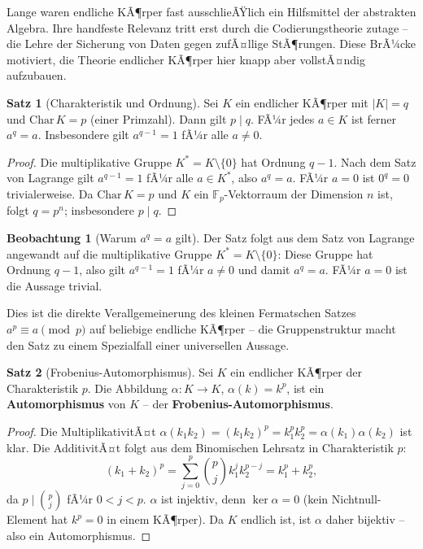 ﻿\documentclass[a4paper,12pt]{report}
\theoremstyle{definition}
\newtheorem{satz}{Satz}
\newtheorem{beobachtung}{Beobachtung}
\begin{document}
Lange waren endliche KÃ¶rper fast ausschlieÃŸlich ein Hilfsmittel der
abstrakten Algebra. Ihre handfeste Relevanz tritt erst durch die
Codierungstheorie zutage -- die Lehre der Sicherung von Daten gegen
zufÃ¤llige StÃ¶rungen. Diese BrÃ¼cke motiviert, die Theorie endlicher
KÃ¶rper hier knapp aber vollstÃ¤ndig aufzubauen.

\begin{satz}[Charakteristik und Ordnung]
    Sei $K$ ein endlicher KÃ¶rper mit $|K| = q$ und $\mathrm{Char}\, K = p$
    (einer Primzahl). Dann gilt $p \mid q$. FÃ¼r jedes $a \in K$ ist ferner
    $a^q = a$. Insbesondere gilt $a^{q-1} = 1$ fÃ¼r alle $a \neq 0$.
\end{satz}
\begin{proof}
    Die multiplikative Gruppe $K^* = K \setminus \{0\}$ hat Ordnung $q - 1$.
    Nach dem Satz von Lagrange gilt $a^{q-1} = 1$ fÃ¼r alle $a \in K^*$,
    also $a^q = a$. FÃ¼r $a = 0$ ist $0^q = 0$ trivialerweise. Da
    $\mathrm{Char}\, K = p$ und $K$ ein $\mathbb{F}_p$-Vektorraum der
    Dimension $n$ ist, folgt $q = p^n$; insbesondere $p \mid q$.
\end{proof}


\begin{beobachtung}[Warum \texorpdfstring{$a^q = a$}{a^q = a} gilt]
    Der Satz folgt aus dem Satz von Lagrange angewandt auf die multiplikative
    Gruppe $K^* = K \setminus \{0\}$: Diese Gruppe hat Ordnung $q - 1$,
    also gilt $a^{q-1} = 1$ fÃ¼r $a \neq 0$ und damit $a^q = a$.
    FÃ¼r $a = 0$ ist die Aussage trivial.

    Dies ist die direkte Verallgemeinerung des kleinen Fermatschen Satzes
    $a^p \equiv a \pmod{p}$ auf beliebige endliche KÃ¶rper -- die Gruppenstruktur
    macht den Satz zu einem Spezialfall einer universellen Aussage.
\end{beobachtung}

\begin{satz}[Frobenius-Automorphismus]
    Sei $K$ ein endlicher KÃ¶rper der Charakteristik $p$. Die Abbildung
    $\alpha : K \to K$, $\alpha(k) = k^p$, ist ein \textbf{Automorphismus}
    von $K$ -- der \textbf{Frobenius-Automorphismus}.
\end{satz}
\begin{proof}
    Die MultiplikativitÃ¤t $\alpha(k_1 k_2) = (k_1 k_2)^p = k_1^p k_2^p
    = \alpha(k_1)\alpha(k_2)$ ist klar.
    Die AdditivitÃ¤t folgt aus dem Binomischen Lehrsatz in Charakteristik $p$:
    \[
        (k_1 + k_2)^p = \sum_{j=0}^p \binom{p}{j} k_1^j k_2^{p-j}
        = k_1^p + k_2^p,
    \]
    da $p \mid \binom{p}{j}$ fÃ¼r $0 < j < p$.
    $\alpha$ ist injektiv, denn $\ker \alpha = 0$ (kein Nichtnull-Element
    hat $k^p = 0$ in einem KÃ¶rper). Da $K$ endlich ist, ist $\alpha$ daher
    bijektiv -- also ein Automorphismus.
\end{proof}
\end{document}
